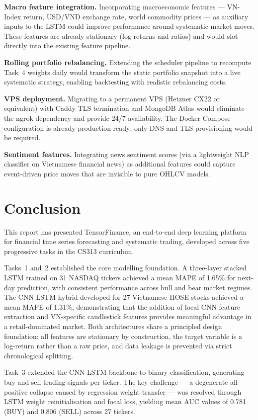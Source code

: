 \documentclass[12pt, a4paper]{article}
\begin{document}
\textbf{Macro feature integration.}
Incorporating macroeconomic features --- VN-Index return, USD/VND
exchange rate, world commodity prices --- as auxiliary inputs to the
LSTM could improve performance around systematic market moves. These
features are already stationary (log-returns and ratios) and would
slot directly into the existing feature pipeline.

\textbf{Rolling portfolio rebalancing.}
Extending the scheduler pipeline to recompute Task~4 weights daily
would transform the static portfolio snapshot into a live systematic
strategy, enabling backtesting with realistic rebalancing costs.

\textbf{VPS deployment.}
Migrating to a permanent VPS (Hetzner CX22 or equivalent) with
Caddy TLS termination and MongoDB Atlas would eliminate the ngrok
dependency and provide 24/7 availability. The Docker Compose
configuration is already production-ready; only DNS and TLS
provisioning would be required.

\textbf{Sentiment features.}
Integrating news sentiment scores (via a lightweight NLP classifier
on Vietnamese financial news) as additional features could capture
event-driven price moves that are invisible to pure OHLCV models.

\section{Conclusion}

This report has presented TensorFinance, an end-to-end deep learning
platform for financial time series forecasting and systematic trading,
developed across five progressive tasks in the CS313 curriculum.

Tasks~1 and~2 established the core modelling foundation. A three-layer
stacked LSTM trained on 31 NASDAQ tickers achieved a mean MAPE of 1.65\%
for next-day prediction, with consistent performance across bull and
bear market regimes. The CNN-LSTM hybrid developed for 27 Vietnamese HOSE
stocks achieved a mean MAPE of 1.31\%, demonstrating that the addition of
local CNN feature extraction and VN-specific candlestick features provides
meaningful advantage in a retail-dominated market. Both architectures share
a principled design foundation: all features are stationary by construction,
the target variable is a log-return rather than a raw price, and data leakage
is prevented via strict chronological splitting.

Task~3 extended the CNN-LSTM backbone to binary classification, generating
buy and sell trading signals per ticker. The key challenge --- a degenerate
all-positive collapse caused by regression weight transfer --- was resolved
through LSTM weight reinitialisation and focal loss, yielding mean AUC values
of 0.781 (BUY) and 0.806 (SELL) across 27 tickers.
\end{document}
